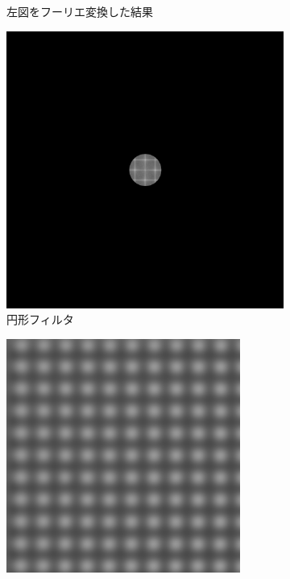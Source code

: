 \documentclass[titlepage]{jsarticle}
\begin{document}
\begin{figure}[htbp]
\begin{subfigure}{0.38\columnwidth}
        \caption{左図をフーリエ変換した結果}
        \label{fig:fourier_hslit}
    \end{subfigure}
    \begin{subfigure}{0.38\columnwidth}
        \centering
        \includegraphics[width=\columnwidth]{20um_blue2_fft_filter3.png}
        \caption{円形フィルタ}
        \label{fig:fourier_circle_filter}
    \end{subfigure}
    \begin{subfigure}{0.38\columnwidth}
        \centering
        \includegraphics[width=\columnwidth]{20um_blue2_fft_filter3_fft_tri.png}

\end{subfigure}
\end{figure}
\end{document}
